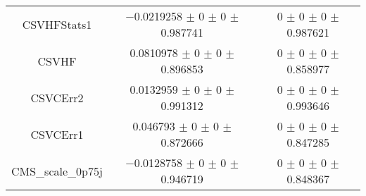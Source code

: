 \begin{table}
\begin{tabular}{ccc}
CSVHFStats1 & \num{-0.0219258} $\pm$ \num{0} $\pm$ \num{0} $\pm$ \num{0.987741} & \num{0} $\pm$ \num{0} $\pm$ \num{0} $\pm$ \num{0.987621}\\
CSVHF & \num{0.0810978} $\pm$ \num{0} $\pm$ \num{0} $\pm$ \num{0.896853} & \num{0} $\pm$ \num{0} $\pm$ \num{0} $\pm$ \num{0.858977}\\
CSVCErr2 & \num{0.0132959} $\pm$ \num{0} $\pm$ \num{0} $\pm$ \num{0.991312} & \num{0} $\pm$ \num{0} $\pm$ \num{0} $\pm$ \num{0.993646}\\
CSVCErr1 & \num{0.046793} $\pm$ \num{0} $\pm$ \num{0} $\pm$ \num{0.872666} & \num{0} $\pm$ \num{0} $\pm$ \num{0} $\pm$ \num{0.847285}\\
CMS\_scale\_0p75j & \num{-0.0128758} $\pm$ \num{0} $\pm$ \num{0} $\pm$ \num{0.946719} & \num{0} $\pm$ \num{0} $\pm$ \num{0} $\pm$ \num{0.848367}\\
\bottomrule
\end{tabular}
\end{table}